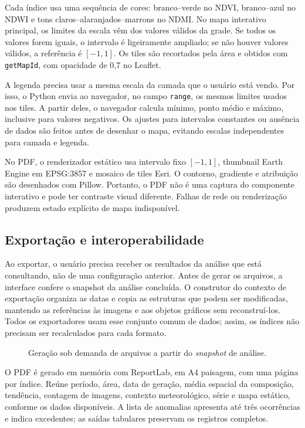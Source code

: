 Cada índice usa uma sequência de cores: branco--verde no NDVI, branco--azul no NDWI e tons claros--alaranjados--marrons no NDMI. No mapa interativo principal, os limites da escala vêm dos valores válidos da grade. Se todos os valores forem iguais, o intervalo é ligeiramente ampliado; se não houver valores válidos, a referência é $[-1,1]$. Os tiles são recortados pela área e obtidos com \texttt{getMapId}, com opacidade de 0,7 no Leaflet.

A legenda precisa usar a mesma escala da camada que o usuário está vendo. Por isso, o Python envia ao navegador, no campo \texttt{range}, os mesmos limites usados nos tiles. A partir deles, o navegador calcula mínimo, ponto médio e máximo, inclusive para valores negativos. Os ajustes para intervalos constantes ou ausência de dados são feitos antes de desenhar o mapa, evitando escalas independentes para camada e legenda.

No PDF, o renderizador estático usa intervalo fixo $[-1,1]$, thumbnail Earth Engine em EPSG:3857 e mosaico de tiles Esri. O contorno, gradiente e atribuição são desenhados com Pillow. Portanto, o PDF não é uma captura do componente interativo e pode ter contraste visual diferente. Falhas de rede ou renderização produzem estado explícito de mapa indisponível.

\subsection{Exportação e interoperabilidade}\label{sec:exportacao-final}

Ao exportar, o usuário precisa receber os resultados da análise que está consultando, não de uma configuração anterior. Antes de gerar os arquivos, a interface confere o snapshot da análise concluída. O construtor do contexto de exportação organiza as datas e copia as estruturas que podem ser modificadas, mantendo as referências às imagens e aos objetos gráficos sem reconstruí-los. Todos os exportadores usam esse conjunto comum de dados; assim, os índices não precisam ser recalculados para cada formato.

\begin{figure}[htbp]
\centering
\resizebox{0.96\textwidth}{!}{}
\caption{Geração sob demanda de arquivos a partir do \textit{snapshot} de análise.}
\label{fig:fluxo-exportacao}
\end{figure}

O PDF é gerado em memória com ReportLab, em A4 paisagem, com uma página por índice. Reúne período, área, data de geração, média espacial da composição, tendência, contagem de imagens, contexto meteorológico, série e mapa estático, conforme os dados disponíveis. A lista de anomalias apresenta até três ocorrências e indica excedentes; as saídas tabulares preservam os registros completos.

